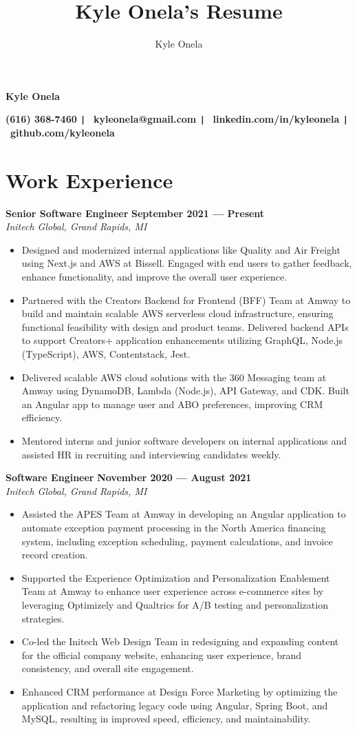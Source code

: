 \documentclass{article}
\title{Kyle Onela's Resume}
\author{Kyle Onela}
\begin{document}
\centerline{\LARGE\textbf{Kyle Onela}}
\smallskip
\centerline{
  \textbf{(616) 368-7460 \texttt{|}} \
  \textbf{kyleonela@gmail.com \texttt{|}} \
  \textbf{linkedin.com/in/kyleonela \texttt{|}} \
  \textbf{github.com/kyleonela}}

\section*{Work Experience}
\textbf{Senior Software Engineer} \hfill \textbf{September 2021 --- Present}\\
\textit{Initech Global, Grand Rapids, MI}
\begin{itemize}
  \item Designed and modernized internal applications like Quality and Air Freight using Next.js and AWS at Bissell. Engaged with end users to gather feedback, enhance functionality, and improve the overall user experience.
  \item Partnered with the Creators Backend for Frontend (BFF) Team at Amway to build and maintain scalable AWS serverless cloud infrastructure, ensuring functional feasibility with design and product teams. Delivered backend APIs to support Creators+ application enhancements utilizing GraphQL, Node.js (TypeScript), AWS, Contentstack, Jest.
  \item Delivered scalable AWS cloud solutions with the 360 Messaging team at Amway using DynamoDB, Lambda (Node.js), API Gateway, and CDK. Built an Angular app to manage user and ABO preferences, improving CRM efficiency.
  \item Mentored interns and junior software developers on internal applications and assisted HR in recruiting and interviewing candidates weekly.
\end{itemize}
\medskip

\textbf{Software Engineer} \hfill \textbf{November 2020 --- August 2021}\\
\textit{Initech Global, Grand Rapids, MI}
\begin{itemize}
  \item Assisted the APES Team at Amway in developing an Angular application to automate exception payment processing in the North America financing system, including exception scheduling, payment calculations, and invoice record creation.
  \item Supported the Experience Optimization and Personalization Enablement Team at Amway to enhance user experience across e-commerce sites by leveraging Optimizely and Qualtrics for A/B testing and personalization strategies.
  \item Co-led the Initech Web Design Team in redesigning and expanding content for the official company website, enhancing user experience, brand consistency, and overall site engagement.
  \item Enhanced CRM performance at Design Force Marketing by optimizing the application and refactoring legacy code using Angular, Spring Boot, and MySQL, resulting in improved speed, efficiency, and maintainability.
\end{itemize}
\medskip
\end{document}
